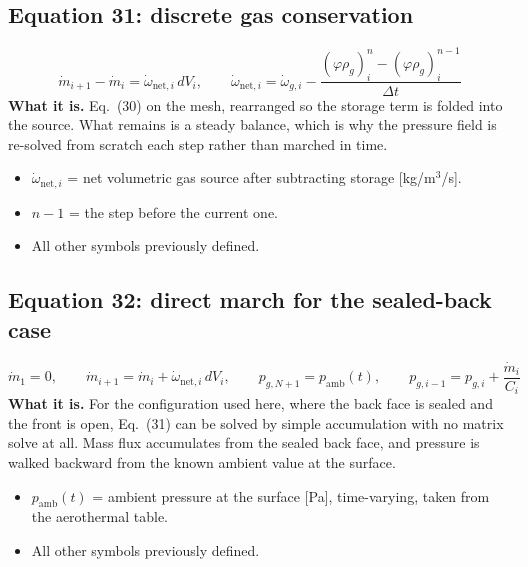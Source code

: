 \documentclass[11pt]{article}
\begin{document}
\subsection*{Equation 31: discrete gas conservation}
\begin{equation}
\dot m_{i+1} - \dot m_i = \dot\omega_{\mathrm{net},i}\, dV_i,
\qquad
\dot\omega_{\mathrm{net},i} = \dot\omega_{g,i}
- \frac{\left(\varphi \rho_g\right)^{n}_i - \left(\varphi \rho_g\right)^{n-1}_i}{\Delta t}
\end{equation}
\textbf{What it is.} Eq.~(30) on the mesh, rearranged so the storage term is
folded into the source. What remains is a steady balance, which is why the
pressure field is re-solved from scratch each step rather than marched in time.
\begin{itemize}
  \item $\dot\omega_{\mathrm{net},i}$ = net volumetric gas source after
        subtracting storage [kg/m$^3$/s].
  \item $n-1$ = the step before the current one.
  \item All other symbols previously defined.
\end{itemize}

\subsection*{Equation 32: direct march for the sealed-back case}
\begin{equation}
\dot m_1 = 0, \qquad
\dot m_{i+1} = \dot m_i + \dot\omega_{\mathrm{net},i}\, dV_i,
\qquad
p_{g,N+1} = p_{\mathrm{amb}}(t), \qquad
p_{g,i-1} = p_{g,i} + \frac{\dot m_i}{C_i}
\end{equation}
\textbf{What it is.} For the configuration used here, where the back face is
sealed and the front is open, Eq.~(31) can be solved by simple accumulation with
no matrix solve at all. Mass flux accumulates from the sealed back face, and
pressure is walked backward from the known ambient value at the surface.
\begin{itemize}
  \item $p_{\mathrm{amb}}(t)$ = ambient pressure at the surface [Pa],
        time-varying, taken from the aerothermal table.
  \item All other symbols previously defined.
\end{itemize}
\end{document}
